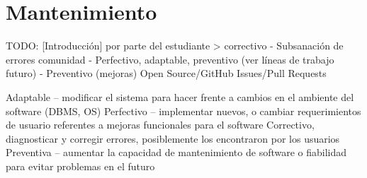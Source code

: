 \chapter{Mantenimiento\label{cap:mantenimiento}}

TODO: [Introducción]
  por parte del estudiante > correctivo
    - Subsanación de errores
  comunidad
    - Perfectivo, adaptable, preventivo (ver líneas de trabajo futuro)
    - Preventivo (mejoras)
  {Open Source/GitHub Issues/Pull Requests}


Adaptable – modificar el sistema para hacer frente a cambios en el ambiente del software (DBMS, OS)
Perfectivo – implementar nuevos, o cambiar requerimientos de usuario referentes a mejoras funcionales para el software
Correctivo, diagnosticar y corregir errores, posiblemente los encontraron por los usuarios
Preventiva – aumentar la capacidad de mantenimiento de software o fiabilidad para evitar problemas en el futuro

